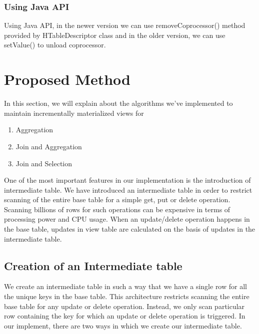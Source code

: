 \documentclass[11pt,a4paper,bibtotoc,idxtotoc,headsepline,footsepline,footexclude,BCOR12mm,DIV13]{scrbook}
\begin{document}
\subsubsection{Using Java API}
Using Java API, in the newer version we can use removeCoprocessor() method provided by HTableDescriptor class and in the older version, we can use setValue() to unload coprocessor.

\section{Proposed Method}
In this section, we will explain about the algorithms we've implemented to maintain incrementally materialized views for 
\begin{enumerate}
    \item Aggregation
    \item Join and Aggregation
    \item Join and Selection
\end{enumerate}

One of the most important features in our implementation is the introduction of intermediate table. We have introduced an intermediate table in order to restrict scanning of the entire base table for a simple get, put or delete operation. Scanning billions of rows for such operations can be expensive in terms of processing power and CPU usage. When an update/delete operation happens in the base table, updates in view table are calculated on the basis of updates in the intermediate table.

\subsection{Creation of an Intermediate table}
\label{subsec:intermediatetable}

We create an intermediate table in such a way that we have a single row for all the unique keys in the base table. This architecture restricts scanning the entire base table for any update or delete operation. Instead, we only scan particular row containing the key for which an update or delete operation is triggered. In our implement, there are two ways in which we create our intermediate table.
\end{document}
